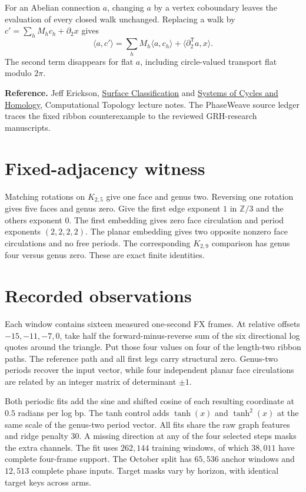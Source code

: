 \documentclass[11pt]{article}
\begin{document}
For an Abelian connection $a$, changing $a$ by a vertex coboundary leaves the evaluation of every closed walk unchanged. Replacing a walk by $c'=\sum_h M_h c_h + \partial_2 x$ gives
\[
 \langle a,c'\rangle = \sum_h M_h\langle a,c_h\rangle
       + \langle \partial_2^{\mathsf T}a,x\rangle .
\]
The second term disappears for flat $a$, including circle-valued transport flat modulo $2\pi$.


\textbf{Reference.} Jeff Erickson, \href{https://jeffe.cs.illinois.edu/teaching/comptop/2023/notes/20-surface-classification.html}{Surface Classification} and \href{https://jeffe.cs.illinois.edu/teaching/comptop/2023/notes/22a-homology.html}{Systems of Cycles and Homology}, Computational Topology lecture notes. The PhaseWeave source ledger traces the fixed ribbon counterexample to the reviewed GRH-research manuscripts.
\newpage
\section{Fixed-adjacency witness}
Matching rotations on $K_{2,5}$ give one face and genus two. Reversing one rotation gives five faces and genus zero. Give the first edge exponent $1$ in $\mathbb Z/3$ and the others exponent $0$. The first embedding gives zero face circulation and period exponents $(2,2,2,2)$. The planar embedding gives two opposite nonzero face circulations and no free periods. The corresponding $K_{2,9}$ comparison has genus four versus genus zero. These are exact finite identities.

\section{Recorded observations}
Each window contains sixteen measured one-second FX frames. At relative offsets $-15,-11,-7,0$, take half the forward-minus-reverse sum of the six directional log quotes around the triangle. Put those four values on four of the length-two ribbon paths. The reference path and all first legs carry structural zero. Genus-two periods recover the input vector, while four independent planar face circulations are related by an integer matrix of determinant $\pm 1$.

Both periodic fits add the sine and shifted cosine of each resulting coordinate at $0.5$ radians per log bp. The tanh control adds $\tanh(x)$ and $\tanh^2(x)$ at the same scale of the genus-two period vector. All fits share the raw graph features and ridge penalty $30$. A missing direction at any of the four selected steps masks the extra channels. The fit uses $262{,}144$ training windows, of which $38{,}011$ have complete four-frame support. The October split has $65{,}536$ anchor windows and $12{,}513$ complete phase inputs. Target masks vary by horizon, with identical target keys across arms.
\end{document}
